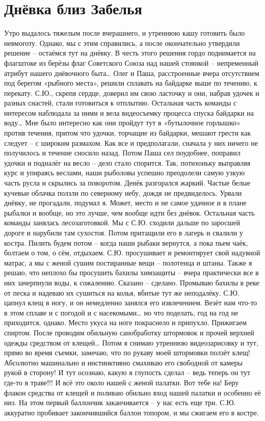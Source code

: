 \chapter{Днёвка близ Забелья} 

Утро выдалось тяжелым после вчерашнего, и утреннюю кашу готовить было невмоготу. Однако, мы с этим справились, а после окончательно утвердили решение – остаёмся тут на днёвку. В честь этого решения гордо поднимается на флагштоке из берёзы флаг Советского Союза над нашей стоянкой – непременный атрибут нашего днёвочного быта… 
Олег и Паша, расстроенные вчера отсутствием под берегом «рыбного места», решили сплавать на байдарке выше по течению, к перекату. С.Ю., скрепя сердце, доверил им свою ласточку и они, набрав удочек и разных снастей, стали готовиться к отплытию. Остальная часть команды с интересом наблюдала за ними и вела видеосъемку процесса спуска байдарки на воду… 
Мне было интересно как они пройдут тут в «бутылочное горлышко» против течения, притом что удочки, торчащие из байдарки, мешают грести как следует – с широким размахом. Как все и предполагали, сначала у них ничего не получилось и течение сносило назад. Потом Паша сел поудобнее, поправил удочки и подналёг на весло – дело стало спорится. Так, потихоньку выправляя курс и упираясь веслами, наши рыболовы успешно преодолели самую узкую часть русла и скрылись за поворотом.
Денёк разгорался жаркий. Частые белые кучевые облачка ползли по северному небу, дождя не предвиделось. Урвали днёвку, не прогадали, подумал я. Может, место и не самое удачное и в плане рыбалки и вообще, но это лучше, чем вообще идти без днёвок.
Остальная часть команды занялась лесозаготовкой. Мы с С.Ю. сходили дальше по заросшей дороге и нарубили там сухостоя. Потом притащили его в лагерь и свалили у костра. Пилить будем потом – когда наши рыбаки вернутся, а пока пьем чаёк, болтаем о том, о сём, отдыхаем. С.Ю. просушивает и ремонтирует свой надувной матрас, а мы с женой сушим постиранные вещи – полотенца и штаны. Также я решаю, что неплохо бы просушить бахилы химзащиты – вчера практически все в них зачерпнули воды, к сожалению. Сказано – сделано. Промываю бахилы в реке от песка и надеваю их сушиться на колья, вбитые тут же неподалёку. 
С.Ю. цапнул клещ в ногу, и он немедленно занялся его извлечением. Везёт нам что-то в этом сплаве и с погодой и с насекомыми… но что поделать, год на год не приходится, однако. Место укуса на ноге покраснело и припухло. Прижигаем спиртом. После проводим обильную санобработку штормовок и прочей верхней одежды средством от клещей… 
Потом я снимаю утреннюю видеозарисовку и тут, прямо во время съемки, замечаю, что по рукаву моей штормовки ползёт клещ! Абсолютно машинально и инстинктивно смахиваю его свободной от камеры рукой в сторону! И тут осознаю, какую я глупость сделал – ведь теперь он тут где-то в траве!!! И всё это около нашей с женой палатки. Вот тебе на! Беру флакон средства от клещей и поливаю обильно вход нашей палатки и особенно её низ. На этом первый баллончик заканчивается – у нас есть еще три. С.Ю. аккуратно пробивает закончившийся баллон топором, и мы сжигаем его в костре. 
